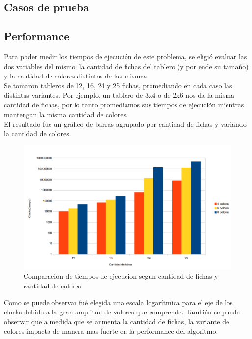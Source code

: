 \newpage

\subsection{Casos de prueba}

\subsection{Performance}

Para poder medir los tiempos de ejecuci\'on de este problema, se eligi\'o evaluar las dos variables del mismo: la cantidad de fichas del tablero (y por ende su tama\~no) y la cantidad de colores distintos de las mismas. \\

Se tomaron tableros de 12, 16, 24 y 25 fichas, promediando en cada caso las distintas variantes. Por ejemplo, un tablero de 3x4 o de 2x6 nos da la misma cantidad de fichas, por lo tanto promediamos sus tiempos de ejecuci\'on mientras mantengan la misma cantidad de colores. \\

El resultado fue un gr\'afico de barras agrupado por cantidad de fichas y variando la cantidad de colores.

\begin{figure}[h]
\begin{center}
\includegraphics[scale=0.7]{./img/ej3_performance.png}
\caption{Comparacion de tiempos de ejecucion segun cantidad de fichas y cantidad de colores}
\end{center}
\end{figure}

Como se puede observar fu\'e elegida una escala logar\'itmica para el eje de los clocks debido a la gran amplitud de valores que comprende. Tambi\'en se puede observar que a medida que se aumenta la cantidad de fichas, la variante de colores impacta de manera mas fuerte en la performance del algoritmo.
